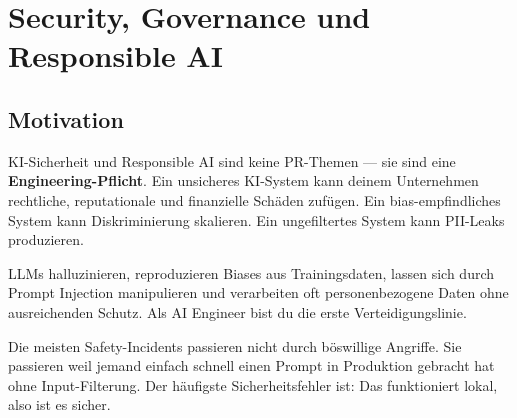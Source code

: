 \chapter{Security, Governance und Responsible AI}
\label{chap:security_governance}


\section{Motivation}

KI-Sicherheit und Responsible AI sind keine PR-Themen --- sie sind eine \textbf{Engineering-Pflicht}. Ein unsicheres KI-System kann deinem Unternehmen rechtliche, reputationale und finanzielle Schäden zufügen. Ein bias-empfindliches System kann Diskriminierung skalieren. Ein ungefiltertes System kann PII-Leaks produzieren.

LLMs halluzinieren, reproduzieren Biases aus Trainingsdaten, lassen sich durch Prompt Injection manipulieren und verarbeiten oft personenbezogene Daten ohne ausreichenden Schutz. Als AI Engineer bist du die erste Verteidigungslinie.

\par



\par\mbox{}\par
\begin{realitycheckEnv}
Die meisten Safety-Incidents passieren nicht durch böswillige Angriffe. Sie passieren weil jemand \glqq einfach schnell\grqq{} einen Prompt in Produktion gebracht hat ohne Input-Filterung. Der häufigste Sicherheitsfehler ist: \glqq Das funktioniert lokal, also ist es sicher.\grqq{}
\end{realitycheckEnv}

